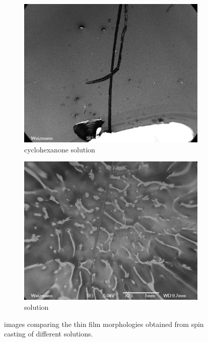 \begin{figure}
\begin{subfigure}{1\textwidth}
\centering
	\includegraphics[width=0.9\linewidth]{./figs/chap1/semCYCLO}
	\caption{cyclohexanone solution}
	\label{fig:semCYCLO}
\end{subfigure}
\vspace{30pt}
\begin{subfigure}{1\textwidth}
\centering
	\includegraphics[width=0.9\linewidth]{./figs/chap1/semDMF}
	\caption{\dmf{} solution}
	\label{fig:semDMF}
\end{subfigure}
\caption{\sem{} images comparing the \pvdf{} thin film morphologies obtained from spin casting of different solutions.}
\label{fig:semsolvent}
\end{figure}

